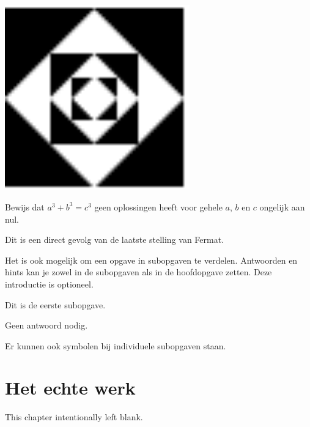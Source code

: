 \documentclass{kampprogramma}
\begin{document}
\begin{center}
\includegraphics[width=8cm]{vierkantlogo}
\end{center}

\begin{opgave}[\ster]
Bewijs dat $a^3 + b^3 = c^3$ geen oplossingen heeft voor gehele $a$,
$b$ en $c$ ongelijk aan nul.
\begin{antwoord}
Dit is een direct gevolg van de laatste stelling van Fermat.
\end{antwoord}
\end{opgave}

\begin{opgave}
Het is ook mogelijk om een opgave in subopgaven te verdelen.
Antwoorden en hints kan je zowel in de subopgaven als in de hoofdopgave
zetten. Deze introductie is optioneel.
\begin{subopgave}
Dit is de eerste subopgave.
\begin{antwoord}
Geen antwoord nodig.
\end{antwoord}
\end{subopgave}
\begin{subopgave}[\schaar]
Er kunnen ook symbolen bij individuele subopgaven staan.
\end{subopgave}
\end{opgave}

\chapter{Het echte werk}

This chapter intentionally left blank.



\hintsantwoorden
\end{document}
